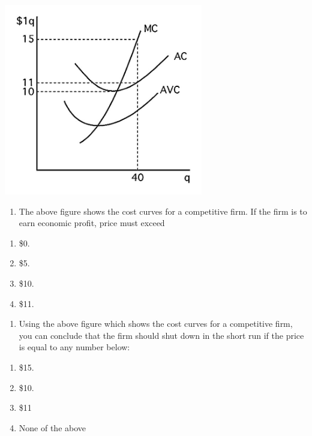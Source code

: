 \documentclass[11pt,]{article}
\providecommand{\tightlist}{%
  \setlength{\itemsep}{0pt}\setlength{\parskip}{0pt}}
\begin{document}
\begin{center}
\includegraphics[width=0.65\textwidth]{week_11.jpg}
\end{center}

\begin{enumerate}
\def\labelenumi{\arabic{enumi})}
\setcounter{enumi}{5}
\tightlist
\item
  The above figure shows the cost curves for a competitive firm. If the
  firm is to earn economic profit, price must exceed
\end{enumerate}

\begin{enumerate}
\def\labelenumi{\Alph{enumi})}
\tightlist
\item
  \$0.
\item
  \$5.
\item
  \$10.
\item
  \$11.
\end{enumerate}

\begin{enumerate}
\def\labelenumi{\arabic{enumi})}
\setcounter{enumi}{6}
\tightlist
\item
  Using the above figure which shows the cost curves for a competitive
  firm, you can conclude that the firm should shut down in the short run
  if the price is equal to any number below:
\end{enumerate}

\begin{enumerate}
\def\labelenumi{\Alph{enumi})}
\tightlist
\item
  \$15.
\item
  \$10.
\item
  \$11
\item
  None of the above
\end{enumerate}
\end{document}
